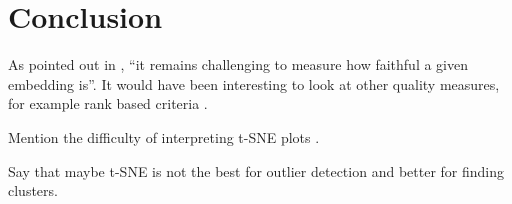 \chapter{Conclusion}\label{chapter:conclusion}

As pointed out in \cite{kobak21}, \enquote{it remains challenging to measure how faithful a given embedding is}. It would have been interesting to look at other quality measures, for example rank based criteria . 


Mention the difficulty of interpreting t-SNE plots \cite{Wa16Distill}. 

Say that maybe t-SNE is not the best for outlier detection and better for finding clusters. 